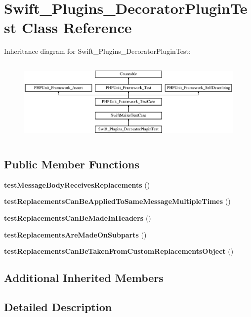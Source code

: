 \section{Swift\+\_\+\+Plugins\+\_\+\+Decorator\+Plugin\+Test Class Reference}
\label{class_swift___plugins___decorator_plugin_test}
Inheritance diagram for Swift\+\_\+\+Plugins\+\_\+\+Decorator\+Plugin\+Test\+:\begin{figure}[H]
\begin{center}
\leavevmode
\includegraphics[height=4.129793cm]{class_swift___plugins___decorator_plugin_test}
\end{center}
\end{figure}
\subsection*{Public Member Functions}
\begin{DoxyCompactItemize}
\item 
{\bf test\+Message\+Body\+Receives\+Replacements} ()
\item 
{\bf test\+Replacements\+Can\+Be\+Applied\+To\+Same\+Message\+Multiple\+Times} ()
\item 
{\bf test\+Replacements\+Can\+Be\+Made\+In\+Headers} ()
\item 
{\bf test\+Replacements\+Are\+Made\+On\+Subparts} ()
\item 
{\bf test\+Replacements\+Can\+Be\+Taken\+From\+Custom\+Replacements\+Object} ()
\end{DoxyCompactItemize}
\subsection*{Additional Inherited Members}


\subsection{Detailed Description}



